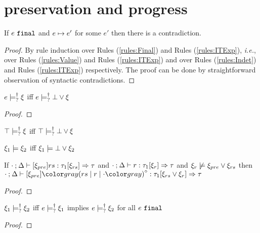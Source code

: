 \section{preservation and progress}

\begin{lem}[Finality]
  \label{lem:finality}
  If $e ~\mathtt{final}$ and $e \mapsto e'$ for some $e'$ then there is a contradiction.
\end{lem}
\begin{proof}By rule induction over Rules (\ref{rules:Final}) and Rules (\ref{rules:ITExp}), \textit{i.e.}, over Rules (\ref{rules:Value}) and Rules (\ref{rules:ITExp}) and over Rules (\ref{rules:Indet}) and Rules (\ref{rules:ITExp}) respectively. The proof can be done by straightforward observation of syntactic contradictions.
\end{proof}

\begin{lem}
  \label{lem:relax-nn-satisfy}
  $e \models_{?}^{\dag} \xi$ iff $e \models_{?}^{\dag} \bot \vee \xi$
\end{lem}
\begin{proof}
\end{proof}

\begin{corol}
  \label{corol:relax-nn-entail}
  $\top \models_{?}^{\dag} \xi$ iff $\top \models_{?}^{\dag} \bot \vee \xi$
\end{corol}

\begin{lem}
  \label{lem:relax-not-redundant}
  $\xi_1 \models \xi_2$ iff $\xi_1 \models \bot \vee \xi_2$
\end{lem}

\begin{lem}
  \label{lem:rule-append}
  If $\cdot \mathbin{;} \Delta \vdash [\xi_{pre}] rs : \tau_1 [\xi_{rs}] \Rightarrow \tau$ and $\cdot \mathbin{;} \Delta \vdash r : \tau_1 [\xi_r] \Rightarrow \tau$ and $\xi_r \not\models \xi_{pre} \vee \xi_{rs}$ then $\chrulstyp{\cdot}{\Delta}{\xi_{pre}}{\rmpointer{\zruls{rs}{r}{\cdot}}}{\tau_1}{\cor{\xi_{rs}}{\xi_r}}{\tau}$
\end{lem}
\begin{proof}
\end{proof}

\begin{defn}
  \label{defn:nn-material-entailment}
  $\xi_1 \models_{?}^{\dag} \xi_2$ iff $e \models_{?}^{\dag} \xi_1$ implies $e \models_{?}^{\dag} \xi_2$ for all $e ~\mathtt{final}$
\end{defn}
\begin{proof}
\end{proof}

